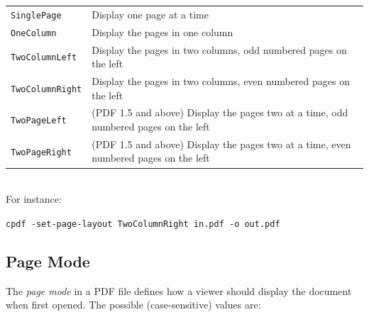 \documentclass{book}
\begin{document}
\vspace{2mm}
  {\small\begin{tabular}{ll}
    \texttt{SinglePage} & \vspace{2mm} \parbox{8cm}{Display one page at a time} \\
    \texttt{OneColumn} & \vspace{2mm} \parbox{8cm}{Display the pages in one column} \\
    \texttt{TwoColumnLeft} & \vspace{2mm} \parbox{8cm}{Display the pages in two columns, odd numbered pages on the left} \\
    \texttt{TwoColumnRight} & \vspace{2mm} \parbox{8cm}{Display the pages in two columns, even numbered pages on the left} \\
    \texttt{TwoPageLeft} & \vspace{2mm} \parbox{8cm}{(PDF 1.5 and above) Display the pages two at a time, odd numbered pages on the left} \\
    \texttt{TwoPageRight} & \vspace{2mm} \parbox{8cm}{(PDF 1.5 and above) Display the pages two at a time, even numbered pages on the left}
  \end{tabular}}\\

  \noindent For instance:

  \begin{framed}
    \noindent\small\verb!cpdf -set-page-layout TwoColumnRight in.pdf -o out.pdf!
  \end{framed}
  


  \subsection{Page Mode}
  The \textit{page mode} in a PDF file defines how a viewer should display the
document when first opened. The possible (case-sensitive) values are:
\end{document}
